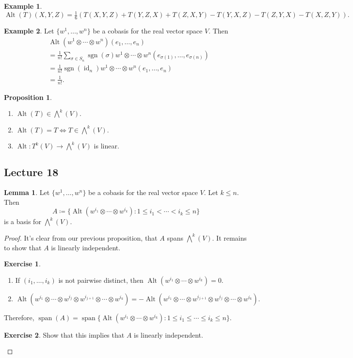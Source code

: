 \documentclass[10pt,letterpaper,cm]{nupset}
\theoremstyle{definition}
\newtheorem{exmp}{Example}
\newtheorem{lemma}{Lemma}
\newtheorem{exercise}{Exercise}
\newtheorem{prop}{Proposition}
\newcommand{\1}{\mathbf{1}}
\newcommand{\0}{\vec 0}
\DeclareMathOperator*{\Span}{span}
\DeclareMathOperator{\id}{id}
\DeclareMathOperator{\Alt}{Alt}
\DeclareMathOperator{\sgn}{sgn}
\begin{document}
\begin{exmp}
$\Alt(T)(X, Y, Z)= \frac{1}{6}(T(X, Y, Z) + T(Y, Z, X) + T(Z, X, Y) -T(Y, X, Z)- T(Z, Y, X) -T(X, Z, Y)).$
\end{exmp}

\begin{exmp}
Let $\{w^1, \ldots, w^n\}$ be a cobasis for the real vector space $V$. Then
\begin{align*}
& \Alt(w^1 \otimes \cdots \otimes w^n)(e_1, \ldots, e_n)\\ & = \frac{1}{n!} \sum_{\sigma \in S_n} \sgn(\sigma)w^1 \otimes \cdots \otimes w^n(e_{\sigma(1)}, \ldots, e_{\sigma(n)}) \\ & =  \frac{1}{n!} \sgn(\id_n) w^1 \otimes \cdots \otimes w^n(e_{1}, \ldots, e_{n}) \\ & = \frac{1}{n!}.
\end{align*}
\end{exmp}

\begin{prop} $ $
\begin{enumerate}
\item $\Alt(T) \in \bigwedge^k(V)$.
\item $\Alt(T) = T \iff T \in \bigwedge^k(V)$.
\item $\Alt : T^k(V) \to \bigwedge^k(V)$ is linear. 
\end{enumerate}
\end{prop}

\subsection{Lecture 18}

\begin{lemma}
Let $\{w^1, \ldots, w^n\}$ be a cobasis for the real vector space $V$. Let $k\leq n$. Then $$A\coloneqq   \{\Alt(w^{i_1} \otimes \cdots \otimes w^{i_k}) : 1 \leq i_1 < \cdots < i_k \leq n \} $$ is a basis for $\bigwedge^k(V)$.
\end{lemma}
\begin{proof}
It's clear from our previous proposition, that $A$ spans $\bigwedge^k(V)$. It remains to show that $A$ is linearly independent. 
\begin{exercise} $ $
\begin{enumerate}
\item If $(i_1, \ldots, i_k)$ is not pairwise distinct, then $\Alt(w^{i_1} \otimes \cdots \otimes w^{i_k}) = 0$.
\item $\Alt(w^{i_1} \otimes \cdots \otimes w^{i_j} \otimes w^{i_{j+1}} \otimes \cdots \otimes w^{i_k}) = -\Alt(w^{i_1} \otimes \cdots \otimes w^{i_{j+1}} \otimes w^{i_{j}} \otimes \cdots \otimes w^{i_k}).$
\end{enumerate}
\end{exercise}
Therefore, $\Span(A) = \Span\{\Alt(w^{i_1} \otimes \cdots \otimes w^{i_k}) : 1 \leq i_1 \leq \cdots \leq i_k \leq n \} $.
\begin{exercise}
Show that this implies that $A$ is linearly independent.
\end{exercise}
\end{proof}
\end{document}

